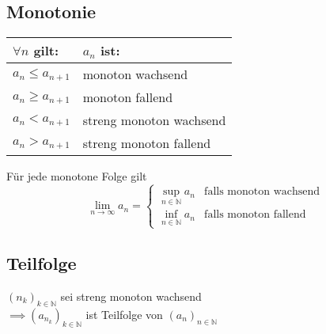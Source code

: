 \documentclass[a4paper,9pt]{extarticle}
\newcommand{\liminfty}[1][n]{\lim_{#1 \to \infty}}
\begin{document}
	\subsection*{Monotonie}
	
	\begin{tabular}{ll}
		$\forall n$ gilt: & $a_n$ ist: \\
		\hline
		$a_n ≤ a_{n+1}$ & monoton wachsend \\
		$a_n ≥ a_{n+1}$ & monoton fallend \\
		$a_n < a_{n+1}$ & streng monoton wachsend \\
		$a_n > a_{n+1}$ & streng monoton fallend \\
		
	\end{tabular}

	Für jede monotone Folge gilt
	$$
		\liminfty{a_n} =
			\begin{cases}
				\sup_{n \in \mathbb{N}}{a_n} & \text{falls monoton wachsend} \\
				\inf_{n \in \mathbb{N}}{a_n} & \text{falls monoton fallend}
			\end{cases}
	$$
	
	\subsection*{Teilfolge}
	
	$(n_k)_{k \in \mathbb{N}}$ sei streng monoton wachsend \\$\implies (a_{n_k})_{k \in \mathbb{N}}$ ist Teilfolge von $(a_n)_{n \in \mathbb{N}}$
	
	\pagebreak
	
	\renewcommand{\arraystretch}{1.7}
\end{document}

